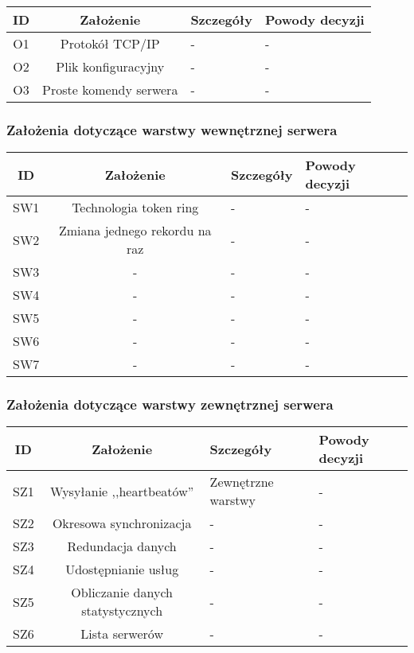 \begin{center}

\begin{tabular}{|c|c|l|l|}
\hline
\textbf{ID} & \textbf{Założenie} & \textbf{Szczegóły} & \textbf{Powody decyzji} \\
\hline
\label{z:o1} O1 & Protokół TCP/IP &  - & - \\
\hline
\label{z:o2} O2 & Plik konfiguracyjny &  - & - \\
\hline
\label{z:o3} O3 & Proste komendy serwera &  - & - \\
\hline

\end{tabular} 

\subsubsection*[Założenia dotyczące warstwy wewnętrznej serwera]{Założenia dotyczące warstwy wewnętrznej serwera} \label{z:sw}

\begin{tabular}{|c|c|l|l|}
\hline
\textbf{ID} & \textbf{Założenie} & \textbf{Szczegóły} & \textbf{Powody decyzji} \\
\hline
\label{z:sw1} SW1 & Technologia token ring &  - & - \\
\hline
\label{z:sw2} SW2 & Zmiana jednego rekordu na raz &  - & - \\
\hline
\label{z:sw3} SW3 & - &  - & - \\
\hline
\label{z:sw4} SW4 & - &  - & - \\
\hline
\label{z:sw5} SW5 & - &  - & - \\
\hline
\label{z:sw6} SW6 & - &  - & - \\
\hline
\label{z:sw7} SW7 & - &  - & - \\
\hline

\end{tabular} 

\subsubsection*[Założenia dotyczące warstwy zewnętrznej serwera]{Założenia dotyczące warstwy zewnętrznej serwera} \label{z:sz}

\begin{tabular}{|c|c|l|l|}
\hline
\textbf{ID} & \textbf{Założenie} & \textbf{Szczegóły} & \textbf{Powody decyzji} \\
\hline
\label{z:sz1} SZ1 & Wysyłanie ,,heartbeatów'' &  Zewnętrzne warstwy & - \\
\hline
\label{z:sz2} SZ2 & Okresowa synchronizacja &  - & - \\
\hline
\label{z:sz3} SZ3 & Redundacja danych &  - & - \\
\hline
\label{z:sz4} SZ4 & Udostępnianie usług &  - & - \\
\hline
\label{z:sz5} SZ5 & Obliczanie danych statystycznych &  - & - \\
\hline
\label{z:sz6} SZ6 & Lista serwerów &  - & - \\
\hline
\end{tabular} 


\end{center}
